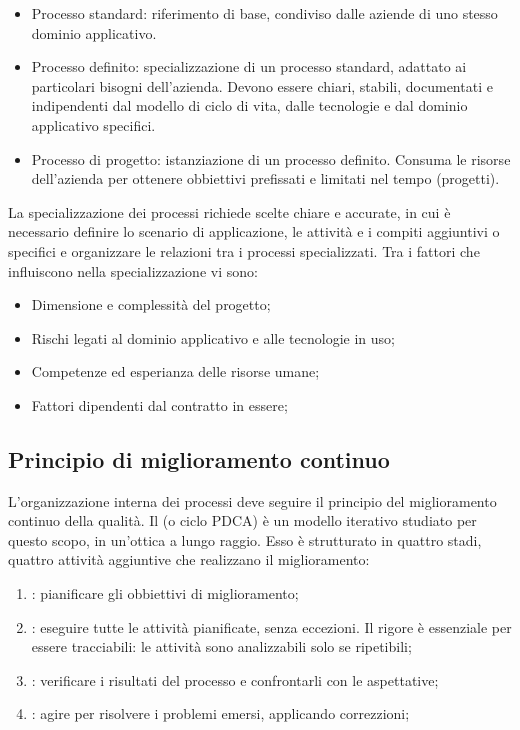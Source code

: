 \begin{itemize}
  \item Processo standard: riferimento di base, condiviso dalle aziende di uno
    stesso dominio applicativo.
  \item Processo definito: specializzazione di un processo standard, adattato ai
    particolari bisogni dell'azienda. Devono essere chiari, stabili, documentati
    e indipendenti dal modello di ciclo di vita, dalle tecnologie e dal dominio
    applicativo specifici.
  \item Processo di progetto: istanziazione di un processo definito. Consuma le
    risorse dell'azienda per ottenere obbiettivi prefissati e limitati nel tempo
    (progetti).
\end{itemize}

La specializzazione dei processi richiede scelte chiare e accurate, in cui è
necessario definire lo scenario di applicazione, le attività e i compiti
aggiuntivi o specifici e organizzare le relazioni tra i processi specializzati.
Tra i fattori che influiscono nella specializzazione vi sono:

\begin{itemize}
  \item Dimensione e complessità del progetto;
  \item Rischi legati al dominio applicativo e alle tecnologie in uso;
  \item Competenze ed esperianza delle risorse umane;
  \item Fattori dipendenti dal contratto in essere;
\end{itemize}

\subsection{Principio di miglioramento continuo}

L'organizzazione interna dei processi deve seguire il principio del
miglioramento continuo della qualità. Il  (o ciclo PDCA)
è un modello iterativo studiato per questo scopo, in un'ottica a lungo raggio.
Esso è strutturato in quattro stadi, quattro attività aggiuntive che realizzano
il miglioramento:

\begin{enumerate}
  \item {}: pianificare gli obbiettivi di miglioramento;
  \item {}: eseguire tutte le attività pianificate, senza
    eccezioni. Il rigore è essenziale per essere tracciabili: le attività
    sono analizzabili solo se ripetibili;
  \item {}: verificare i risultati del processo e
    confrontarli con le aspettative;
  \item {}: agire per risolvere i problemi emersi,
    applicando correzzioni;
\end{enumerate}
